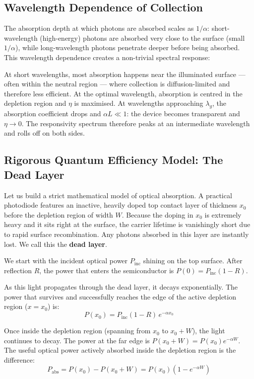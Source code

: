 \subsection{Wavelength Dependence of Collection}

The absorption depth at which photons are absorbed scales as $1/\alpha$: short-wavelength (high-energy) photons are absorbed very close to the surface (small $1/\alpha$), while long-wavelength photons penetrate deeper before being absorbed. This wavelength dependence creates a non-trivial spectral response:

At short wavelengths, most absorption happens near the illuminated surface — often within the neutral region — where collection is diffusion-limited and therefore less efficient. At the optimal wavelength, absorption is centred in the depletion region and $\eta$ is maximised. At wavelengths approaching $\lambda_g$, the absorption coefficient drops and $\alpha L \ll 1$: the device becomes transparent and $\eta \to 0$. The responsivity spectrum therefore peaks at an intermediate wavelength and rolls off on both sides.

\subsection{Rigorous Quantum Efficiency Model: The Dead Layer}

Let us build a strict mathematical model of optical absorption. A practical photodiode features an inactive, heavily doped top contact layer of thickness $x_0$ before the depletion region of width $W$. Because the doping in $x_0$ is extremely heavy and it sits right at the surface, the carrier lifetime is vanishingly short due to rapid surface recombination. Any photons absorbed in this layer are instantly lost. We call this the \textbf{dead layer}.

We start with the incident optical power $P_{\text{inc}}$ shining on the top surface. After reflection $R$, the power that enters the semiconductor is $P(0) = P_{\text{inc}}(1 - R)$.

As this light propagates through the dead layer, it decays exponentially. The power that survives and successfully reaches the edge of the active depletion region ($x = x_0$) is:
\begin{equation*}
    P(x_0) = P_{\text{inc}}(1 - R)\,e^{-\alpha x_0}
\end{equation*}

Once inside the depletion region (spanning from $x_0$ to $x_0 + W$), the light continues to decay. The power at the far edge is $P(x_0 + W) = P(x_0)e^{-\alpha W}$. The useful optical power actively absorbed inside the depletion region is the difference:
\begin{equation*}
    P_{\text{abs}} = P(x_0) - P(x_0 + W) = P(x_0)\!\left(1 - e^{-\alpha W}\right)
\end{equation*}

